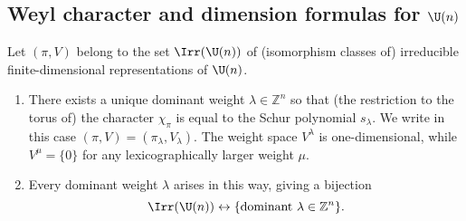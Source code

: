 \documentclass[reqno]{amsart} 
\begin{document}
\subsection{Weyl character and dimension formulas for \texorpdfstring{$\U(n)$}{U(n)}}

\begin{theorem}\label{thm:weyl-char-Un}
  Let $(\pi,V)$ belong to the set $\Irr(\U(n))$ of (isomorphism classes of) irreducible finite-dimensional representations of $\U(n)$.
  \begin{enumerate}
  \item There exists a unique dominant weight $\lambda \in \mathbb{Z}^n$ so that (the restriction to the torus of) the character $\chi_\pi$ is equal to the Schur polynomial $s_\lambda$.  We write in this case $(\pi,V) = (\pi_\lambda ,V_\lambda)$.  The weight space $V^{\lambda}$ is one-dimensional, while $V^{\mu} = \{0\}$ for any lexicographically larger weight $\mu$.
  \item Every dominant weight $\lambda$ arises in this way, giving a bijection
    \begin{equation*}
      \Irr(\U(n)) \leftrightarrow \{\text{dominant } \lambda \in \mathbb{Z}^n\}.
    \end{equation*}
  \end{enumerate}
\end{theorem}
\end{document}
